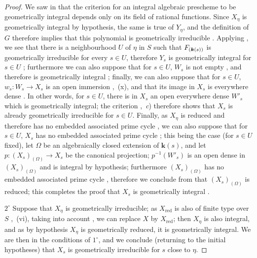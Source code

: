 \begin{proof}
We saw in  that the criterion for an integral algebraic prescheme to be geometrically integral depends only on its field of rational functions. Since $X_\eta$ is geometrically integral by hypothesis, the same is true of $Y_\eta$, and the definition of $G$ therefore implies that this polynomial is geometrically irreducible .
Applying , we see that there is a neighbourhood $U$ of $\eta$ in $S$ such that $F_{(\boldsymbol{k}(s))}$ is geometrically irreducible for every $s\in U$, therefore $Y_s$ is geometrically integral for $s\in U$ ; furthermore we can also suppose that for $s\in U$, $W_s$ is not empty , and therefore is geometrically integral ; finally, we can also suppose that
for $s\in U$, $w_s:W_s\to X_s$ is an open immersion ,~(x), and that its image in $X_s$ is everywhere dense .
In other words, for $s\in U$, there is in $X_s$ an open everywhere dense $W'_s$ which is geometrically integral; the criterion ,~\emph{c}) therefore shows that $X_s$ is already geometrically irreducible for $s\in U$.
Finally, as $X_\eta$ is reduced and therefore has no embedded associated prime cycle , we can also suppose that for $s\in U$, $X_s$ has no embedded associated prime cycle ; this being the case (for $s\in U$ fixed), let $\Omega$ be an algebraically closed extension of $\boldsymbol{k}(s)$, and let $p:(X_s)_{(\Omega)}\to X_s$ be the canonical projection; $p^{-1}(W'_s)$ is an open dense in $(X_s)_{(\Omega)}$  and is integral by hypothesis; furthermore $(X_s)_{(\Omega)}$ has no embedded associated prime cycle , therefore we conclude from  that $(X_s)_{(\Omega)}$ is reduced; this completes the proof that $X_s$ is geometrically integral .

$2^\circ$ Suppose that $X_\eta$ is geometrically irreducible; as $X_{\mathrm{red}}$ is also of finite type over $S$ ,~(vi), taking into account , we can replace $X$ by $X_{\mathrm{red}}$; then $X_\eta$ is also integral, and as by hypothesis $X_\eta$ is geometrically reduced, it is geometrically integral. We are then in the conditions of $1^\circ$, and we conclude (returning to the initial hypotheses) that $X_s$ is geometrically irreducible for $s$ close to $\eta$.


\end{proof}
